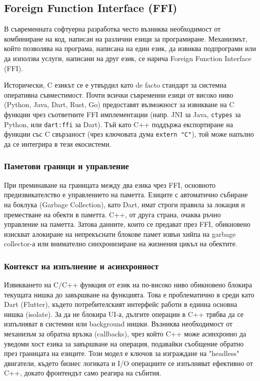 \subsection{Foreign Function Interface (FFI)}

В съвременната софтуерна разработка често възниква необходимост от комбиниране на код, написан на различни езици за програмиране. Механизмът, който позволява на програма, написана на един език, да извиква подпрограми или да използва услуги, написани на друг език, се нарича Foreign Function Interface (FFI).

Исторически, C езикът се е утвърдил като de facto стандарт за системна оперативна съвместимост. Почти всички съвременни езици от високо ниво (Python, Java, Dart, Rust, Go) предоставят възможност за извикване на C функции чрез съответните FFI имплементации (напр. JNI за Java, \texttt{ctypes} за Python, или \texttt{dart:ffi} за Dart). Тъй като C++ поддържа експортиране на функции със C свързаност (чрез ключовата дума \texttt{extern "C"}), той може напълно да се интегрира в тези екосистеми.

\subsubsection{Паметови граници и управление}

При преминаване на границата между два езика чрез FFI, основното предизвикателство е управлението на паметта. Езиците с автоматично събиране на боклука (Garbage Collection), като Dart, имат строги правила за локация и преместване на обекти в паметта. C++, от друга страна, очаква ръчно управление на паметта. Затова данните, които се предават през FFI, обикновено изискват алокиране на непрекъснати блокове памет извън хийпа на garbage collector-а или внимателно синхронизиране на жизнения цикъл на обектите.

\subsubsection{Контекст на изпълнение и асинхронност}

Извикването на C/C++ функция от език на по-високо ниво обикновено блокира текущата нишка до завършване на функцията. Това е проблематично в среди като Dart (Flutter), където потребителският интерфейс работи в единна основна нишка (isolate). За да не блокира UI-а, дългите операции в C++ трябва да се изпълняват в системни или background нишки. Възниква необходимост от механизъм за обратна връзка (callbacks), чрез който C++ може асинхронно да уведоми хост езика за завършване на операция, подавайки съобщение обратно през границата на езиците. Този модел е ключов за изграждане на "headless" двигатели, където бизнес логиката и I/O операциите се изпълняват ефективно от C++, докато фронтендът само реагира на събития.

